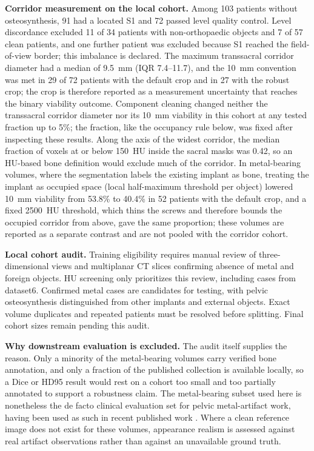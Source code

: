 \documentclass[9pt]{extarticle}
\begin{document}
\textbf{Corridor measurement on the local cohort.} Among 103 patients without osteosynthesis, 91 had a located S1 and 72 passed level quality control. Level discordance excluded 11 of 34 patients with non-orthopaedic objects and 7 of 57 clean patients, and one further patient was excluded because S1 reached the field-of-view border; this imbalance is declared. The maximum transsacral corridor diameter had a median of 9.5~mm (IQR 7.4--11.7), and the 10~mm convention was met in 29 of 72 patients with the default crop and in 27 with the robust crop; the crop is therefore reported as a measurement uncertainty that reaches the binary viability outcome. Component cleaning changed neither the transsacral corridor diameter nor its 10~mm viability in this cohort at any tested fraction up to 5\%; the fraction, like the occupancy rule below, was fixed after inspecting these results. Along the axis of the widest corridor, the median fraction of voxels at or below 150~HU inside the sacral masks was 0.42, so an HU-based bone definition would exclude much of the corridor. In metal-bearing volumes, where the segmentation labels the existing implant as bone, treating the implant as occupied space (local half-maximum threshold per object) lowered 10~mm viability from 53.8\% to 40.4\% in 52 patients with the default crop, and a fixed 2500~HU threshold, which thins the screws and therefore bounds the occupied corridor from above, gave the same proportion; these volumes are reported as a separate contrast and are not pooled with the corridor cohort.

\textbf{Local cohort audit.} Training eligibility requires manual review of three-dimensional views and multiplanar CT slices confirming absence of metal and foreign objects. HU screening only prioritizes this review, including cases from dataset6. Confirmed metal cases are candidates for testing, with pelvic osteosynthesis distinguished from other implants and external objects. Exact volume duplicates and repeated patients must be resolved before splitting. Final cohort sizes remain pending this audit.

\textbf{Why downstream evaluation is excluded.} The audit itself supplies the reason. Only a minority of the metal-bearing volumes carry verified bone annotation, and only a fraction of the published collection is available locally, so a Dice or HD95 result would rest on a cohort too small and too partially annotated to support a robustness claim. The metal-bearing subset used here is nonetheless the de facto clinical evaluation set for pelvic metal-artifact work, having been used as such in recent published work \citep{wang2025adaptiveweighting}. Where a clean reference image does not exist for these volumes, appearance realism is assessed against real artifact observations rather than against an unavailable ground truth.
\end{document}
